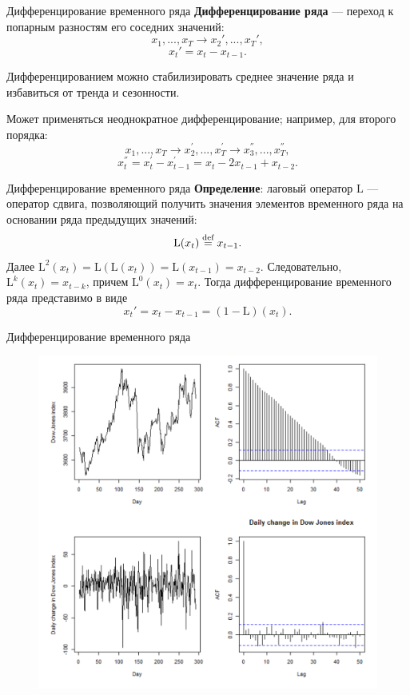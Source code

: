 \begin{frame}{Дифференцирование временного ряда}
\textbf{Дифференцирование ряда} — переход к попарным разностям его соседних
значений:
\begin{equation*}
x_1,...,x_T \rightarrow x_2',...,x_T',
\end{equation*}
\begin{equation*}
x_t' = x_{t} - x_{t-1} .
\end{equation*}

Дифференцированием можно стабилизировать среднее значение ряда и избавиться от тренда и сезонности.

Может применяться неоднократное дифференцирование; например, для второго порядка:
\begin{equation*}
x_1,...,x_T
\rightarrow
x_2^{'},...,x_T^{'}
\rightarrow
x_3^{''},...,x_T^{''},
\end{equation*}
\begin{equation*}
x_t^{''} = x_t^{'} - x_{t-1}^{'} = x_t - 2x_{t-1} + x_{t-2}.
\end{equation*}
\end{frame}
\begin{frame}{Дифференцирование временного ряда}
\textbf{Определение}: лаговый оператор $\mathrm{L}$ --- оператор сдвига, позволяющий получить значения элементов временного ряда на основании ряда предыдущих значений:
\begin{equation*}
    \mathrm{L}(x_t) \stackrel{\text{def}}{=} x_{t-1}.
\end{equation*}
Далее $\mathrm{L}^2(x_t) = \mathrm{L}(\mathrm{L}(x_t)) = \mathrm{L}(x_{t-1}) = x_{t-2}.$
\vfill
Следовательно,  $\mathrm{L}^k(x_t) = x_{t-k}$, причем $\mathrm{L}^0(x_t) = x_{t}$.
\vfill
Тогда дифференцирование временного ряда представимо в виде
\begin{equation*}
    x_t' = x_{t} - x_{t-1} = ( 1 - \mathrm{L})(x_t).
\end{equation*}

\end{frame}
\begin{frame}{Дифференцирование временного ряда}
\begin{figure}
    \centering
    \includegraphics[width=0.75\linewidth]{lecture_2/fig/ts_diff.png}
\end{figure}
\end{frame}
